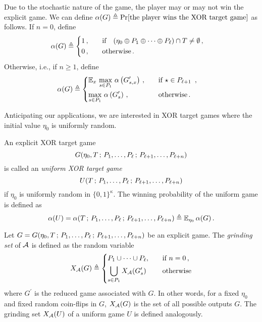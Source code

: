 Due to the stochastic nature of the game, 
the player may or may not win the explicit game. 
We can define 
$\alpha(G) \triangleq \Pr[\text{the player wins the XOR target game}]$
as follows.
If $n = 0$, define
\begin{align*}
    \alpha(G) &\triangleq 
    \begin{dcases}
        1\,, & \quad\text{if}\quad (\eta_0 \oplus P_1 \oplus \cdots \oplus P_\ell) \cap T \neq \emptyset 
        \, , \\
        0\,, & \quad\text{otherwise}
        \, .
    \end{dcases}
\end{align*}
Otherwise, i.e., if $n \geq 1$, 
define 
\begin{align}\label{eq:winning-prob}
    \alpha(G) &\triangleq 
    \begin{dcases}
        \operatorname{\mathbb{E}}_{x}\, 
            \max_{s \in P_1 }\, 
            \alpha\left(
                G^\prime_{s, x}
                \right) 
        \,, &\quad\text{if $\star \in P_{\ell + 1}$ }\,,
        \\
        \max_{s \in P_1 }\, 
        \alpha\left(
            G^\prime_s
            \right)
        \,, &\quad\text{otherwise} \,.
    \end{dcases}
\end{align}


Anticipating our applications, 
we are interested in XOR target games where the initial value $\eta_0$ is uniformly random. 
\begin{definition}
    \label{def:xor-game-uniform}
    An explicit XOR target game $$G(\eta_0,T\,;\, P_1, \ldots, P_\ell \,;\, P_{\ell+1}, \ldots, P_{\ell+n})$$ 
    is called 
    an \emph{uniform XOR target game}
    \[
        U(T\,;\, P_1, \ldots, P_\ell \,;\, P_{\ell+1}, \ldots, P_{\ell+n})
    \]
    if $\eta_0$ is uniformly random in $\{0,1\}^\kappa$. 
    The winning probability of the uniform game is defined as 
    \[
        \alpha(U) = \alpha(T\,;\, P_1, \ldots, P_\ell \,;\, P_{\ell+1}, \ldots, P_{\ell+n}) 
        \triangleq \operatorname{\mathbb{E}}_{\eta_0} \alpha(G)\,.
    \]
\end{definition}


Let $G = G(\eta_0,T\,;\, P_1, \ldots, P_\ell \,;\, P_{\ell+1}, \ldots, P_{\ell+n})$ be an explicit game. 
The \emph{grinding set} of $\mathcal{A}$ is defined as the random variable 
\[
    X_{\mathcal{A}}(G) 
    \triangleq 
        \begin{dcases}
            P_1 \cup \cdots \cup P_\ell, &\quad\text{if $n = 0$}\,, \\
            \bigcup_{s \in P_1} X_{\mathcal{A}}(G^\prime_s)\, &\quad\text{otherwise}
        \end{dcases}        
\] 
where $G^\prime$ is the reduced game associated with $G$. 
In other words, 
for a fixed $\eta_0$ and fixed random coin-flips in $G$,
$X_{\mathcal{A}}(G)$ is the set of all possible outputs $G$. 
The grinding set $X_{\mathcal{A}}(U)$ of a uniform game $U$ is defined analogously.

